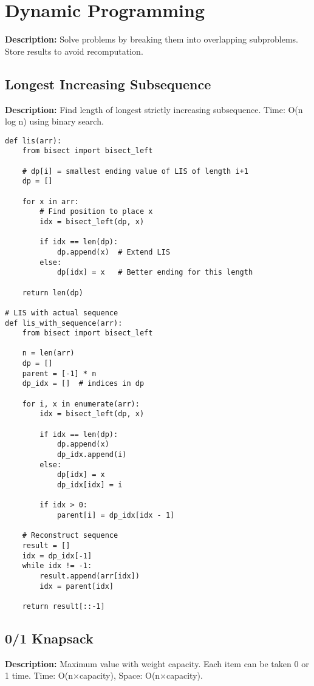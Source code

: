 \section{Dynamic Programming}

\textbf{Description:} Solve problems by breaking them into overlapping subproblems. Store results to avoid recomputation.

\subsection{Longest Increasing Subsequence}
\textbf{Description:} Find length of longest strictly increasing subsequence. Time: O(n log n) using binary search.

\begin{lstlisting}
def lis(arr):
    from bisect import bisect_left
    
    # dp[i] = smallest ending value of LIS of length i+1
    dp = []
    
    for x in arr:
        # Find position to place x
        idx = bisect_left(dp, x)
        
        if idx == len(dp):
            dp.append(x)  # Extend LIS
        else:
            dp[idx] = x   # Better ending for this length
    
    return len(dp)

# LIS with actual sequence
def lis_with_sequence(arr):
    from bisect import bisect_left
    
    n = len(arr)
    dp = []
    parent = [-1] * n
    dp_idx = []  # indices in dp
    
    for i, x in enumerate(arr):
        idx = bisect_left(dp, x)
        
        if idx == len(dp):
            dp.append(x)
            dp_idx.append(i)
        else:
            dp[idx] = x
            dp_idx[idx] = i
        
        if idx > 0:
            parent[i] = dp_idx[idx - 1]
    
    # Reconstruct sequence
    result = []
    idx = dp_idx[-1]
    while idx != -1:
        result.append(arr[idx])
        idx = parent[idx]
    
    return result[::-1]
\end{lstlisting}

\subsection{0/1 Knapsack}
\textbf{Description:} Maximum value with weight capacity. Each item can be taken 0 or 1 time. Time: O(n×capacity), Space: O(n×capacity).

